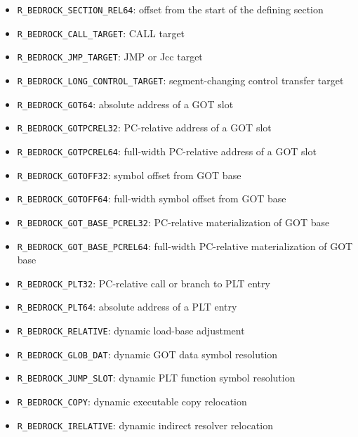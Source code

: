 \documentclass[10pt,twoside]{article}
\begin{document}
\begin{itemize}
\item \texttt{R\_\allowbreak{}BEDROCK\_\allowbreak{}SECTION\_\allowbreak{}REL64}: offset from the start of the defining section
\item \texttt{R\_\allowbreak{}BEDROCK\_\allowbreak{}CALL\_\allowbreak{}TARGET}: CALL target
\item \texttt{R\_\allowbreak{}BEDROCK\_\allowbreak{}JMP\_\allowbreak{}TARGET}: JMP or Jcc target
\item \texttt{R\_\allowbreak{}BEDROCK\_\allowbreak{}LONG\_\allowbreak{}CONTROL\_\allowbreak{}TARGET}: segment-changing control transfer target
\item \texttt{R\_\allowbreak{}BEDROCK\_\allowbreak{}GOT64}: absolute address of a GOT slot
\item \texttt{R\_\allowbreak{}BEDROCK\_\allowbreak{}GOTPCREL32}: PC-relative address of a GOT slot
\item \texttt{R\_\allowbreak{}BEDROCK\_\allowbreak{}GOTPCREL64}: full-width PC-relative address of a GOT slot
\item \texttt{R\_\allowbreak{}BEDROCK\_\allowbreak{}GOTOFF32}: symbol offset from GOT base
\item \texttt{R\_\allowbreak{}BEDROCK\_\allowbreak{}GOTOFF64}: full-width symbol offset from GOT base
\item \texttt{R\_\allowbreak{}BEDROCK\_\allowbreak{}GOT\_\allowbreak{}BASE\_\allowbreak{}PCREL32}: PC-relative materialization of GOT base
\item \texttt{R\_\allowbreak{}BEDROCK\_\allowbreak{}GOT\_\allowbreak{}BASE\_\allowbreak{}PCREL64}: full-width PC-relative materialization of GOT base
\item \texttt{R\_\allowbreak{}BEDROCK\_\allowbreak{}PLT32}: PC-relative call or branch to PLT entry
\item \texttt{R\_\allowbreak{}BEDROCK\_\allowbreak{}PLT64}: absolute address of a PLT entry
\item \texttt{R\_\allowbreak{}BEDROCK\_\allowbreak{}RELATIVE}: dynamic load-base adjustment
\item \texttt{R\_\allowbreak{}BEDROCK\_\allowbreak{}GLOB\_\allowbreak{}DAT}: dynamic GOT data symbol resolution
\item \texttt{R\_\allowbreak{}BEDROCK\_\allowbreak{}JUMP\_\allowbreak{}SLOT}: dynamic PLT function symbol resolution
\item \texttt{R\_\allowbreak{}BEDROCK\_\allowbreak{}COPY}: dynamic executable copy relocation
\item \texttt{R\_\allowbreak{}BEDROCK\_\allowbreak{}IRELATIVE}: dynamic indirect resolver relocation

\end{itemize}
\end{document}
